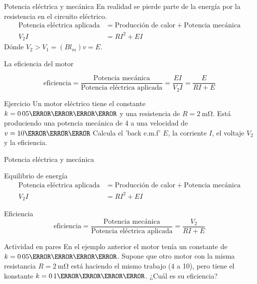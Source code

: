 \documentclass[presentation,aspectratio=169]{beamer}
\begin{document}
\begin{frame}[label={sec:org720bb2a}]{Potencia eléctrica y mecánica}
En realidad se pierde parte de la energía por la resistencia en el circuito eléctrico.
\begin{align*}
\text{Potencia eléctrica aplicada} &= \text{Producción de calor} + \text{Potencia mecánica}\\
V_2 I &= RI^2 + EI
\end{align*}
Dónde \(V_2 > V_1 = (Bl_m)v = E\).

La eficiencia del motor

\[ \text{eficiencia} = \frac{\text{Potencia mecánica}}{\text{Potencia eléctrica aplicada}} = \frac{EI}{V_2I} = \frac{E}{RI + E}\]

\alert{Ejercicio} Un motor eléctrico tiene el constante \(k=\unit{0.05}{\kilo\newton\per\ampere}\) y una resistencia de \(R=\SI{2}{\milli\ohm}\). Está produciendo una potencia mecánica de \unit{4}{\mega\watt} a una velocidad de \(v=\unit{10}{\meter\per\second}\) Calcula el 'back e.m.f' \(E\), la corriente \(I\), el voltaje \(V_2\) y la eficiencia.
\end{frame}

\begin{frame}[label={sec:org43f9ec3}]{Potencia eléctrica y mecánica}
\begin{block}{Equilibrio de energía}
\begin{align*}
\text{Potencia eléctrica aplicada} &= \text{Producción de calor} + \text{Potencia mecánica}\\
V_2 I &= RI^2 + EI
\end{align*}
\end{block}
\begin{block}{Eficiencia}
\[ \text{eficiencia} = \frac{\text{Potencia mecánica}}{\text{Potencia eléctrica aplicada}} = \frac{V_2}{RI + E}\]

\alert{Actividad en pares} En el ejemplo anterior el motor tenía un constante de \(k=\unit{0.05}{\kilo\newton\per\ampere}\). Supone que otro motor con la misma resistancia \(R=\SI{2}{\milli\ohm}\) está haciendo el mismo trabajo (\unit{4}{\mega\watt} a \unit{10}{\meter\per\second}), pero tiene el konstante \(k=\unit{0.1}{\kilo\newton\per\ampere}\). ¿Cuál es su eficiencia?
\end{block}
\end{frame}
\end{document}
